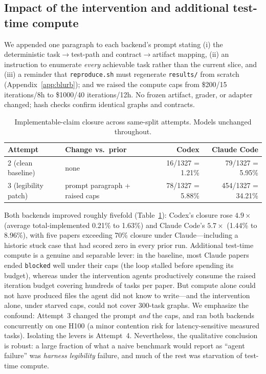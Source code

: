 \documentclass{article}
\begin{document}
\subsection{Impact of the intervention and additional test-time compute}

We appended one paragraph to each backend's prompt stating (i) the
deterministic task$\rightarrow$test-path and contract$\rightarrow$artifact
mapping, (ii) an instruction to enumerate \emph{every} achievable task rather
than the current slice, and (iii) a reminder that \texttt{reproduce.sh} must
regenerate \texttt{results/} from scratch (Appendix~\ref{app:blurb}); and we
raised the compute caps from \$200/15 iterations/8h to \$1000/40
iterations/12h. No frozen artifact, grader, or adapter changed; hash checks
confirm identical graphs and contracts.

\begin{table}[t]
\caption{Implementable-claim closure across same-split attempts. Models
unchanged throughout.}
\label{tab:attempts}
\begin{center}
\small
\begin{tabular}{llrr}
\toprule
\textbf{Attempt} & \textbf{Change vs.\ prior} & \textbf{Codex} & \textbf{Claude Code} \\
\midrule
2 (clean baseline) & none & 16/1327 = 1.21\% & 79/1327 = 5.95\% \\
3 (legibility patch) & prompt paragraph + raised caps & 78/1327 = 5.88\% & 454/1327 = 34.21\% \\
\bottomrule
\end{tabular}
\end{center}
\end{table}

Both backends improved roughly fivefold (Table~\ref{tab:attempts}): Codex's
closure rose $4.9\times$ (average total-implemented 0.21\% to 1.63\%) and
Claude Code's $5.7\times$ (1.44\% to 8.96\%), with five papers exceeding
70\% closure under Claude---including a historic stuck case that had scored
zero in every prior run. Additional test-time compute is a genuine and
separable lever: in the baseline, most Claude papers ended
\texttt{blocked} well under their caps (the loop stalled before spending its
budget), whereas under the intervention agents productively consume the
raised iteration budget covering hundreds of tasks per paper. But compute
alone could not have produced files the agent did not know to write---and
the intervention alone, under starved caps, could not cover 300-task graphs.
We emphasize the confound: Attempt~3 changed the prompt \emph{and} the caps,
and ran both backends concurrently on one H100 (a minor contention risk for
latency-sensitive measured tasks). Isolating the levers is Attempt~4.
Nevertheless, the qualitative conclusion is robust: a large fraction of what
a naive benchmark would report as ``agent failure'' was \emph{harness
legibility} failure, and much of the rest was starvation of test-time
compute.
\end{document}

